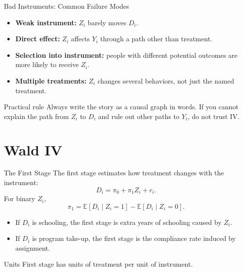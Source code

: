 \documentclass[11pt,aspectratio=169]{beamer}
\newcommand{\E}{\mathbb{E}}
\begin{document}
\begin{frame}{Bad Instruments: Common Failure Modes}
  \begin{itemize}
    \item \textbf{Weak instrument:} \(Z_i\) barely moves \(D_i\).
    \item \textbf{Direct effect:} \(Z_i\) affects \(Y_i\) through a path other than treatment.
    \item \textbf{Selection into instrument:} people with different potential outcomes are more likely to receive \(Z_i\).
    \item \textbf{Multiple treatments:} \(Z_i\) changes several behaviors, not just the named treatment.
  \end{itemize}

  \begin{block}{Practical rule}
    Always write the story as a causal graph in words. If you cannot explain the path from \(Z_i\) to \(D_i\) and rule out other paths to \(Y_i\), do not trust IV.
  \end{block}
\end{frame}

\section{Wald IV}

\begin{frame}{The First Stage}
  \hypertarget{main:first-stage}{}
  The first stage estimates how treatment changes with the instrument:
  \[
    D_i = \pi_0 + \pi_1 Z_i + r_i.
  \]
  For binary \(Z_i\),
  \[
    \pi_1 = \E[D_i\mid Z_i=1]-\E[D_i\mid Z_i=0].
  \]

  \begin{itemize}
    \item If \(D_i\) is schooling, the first stage is extra years of schooling caused by \(Z_i\).
    \item If \(D_i\) is program take-up, the first stage is the compliance rate induced by assignment.
  \end{itemize}

  \begin{block}{Units}
    First stage has units of treatment per unit of instrument.
  \end{block}
\end{frame}
\end{document}
